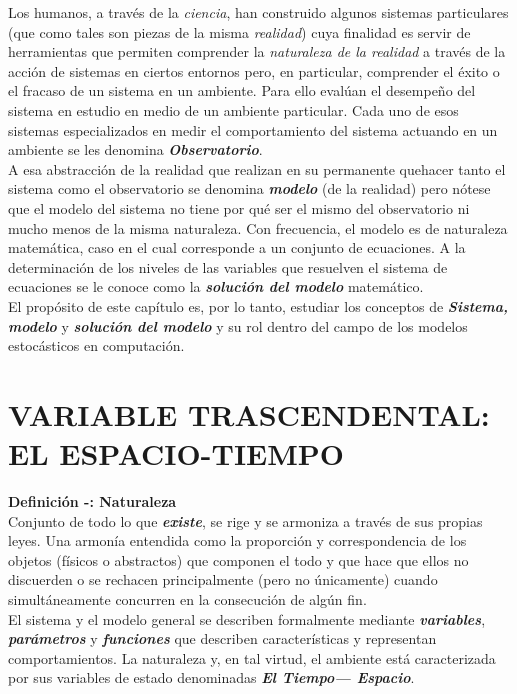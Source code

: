 Los humanos, a través de la \textit{ciencia}, han construido algunos sistemas particulares (que como tales son piezas de la misma \textit{realidad}) cuya finalidad es servir de herramientas que permiten comprender la \textit{naturaleza de la realidad} a través de la acción de sistemas en ciertos entornos pero, en particular, comprender el éxito o el fracaso de un sistema en un ambiente. Para ello evalúan el desempeño del sistema en estudio en medio de un ambiente particular. Cada uno de esos sistemas especializados en medir el comportamiento del sistema actuando en un ambiente se les denomina \textbf{\textit{Observatorio}}.\\

A esa abstracción de la realidad que realizan en su permanente quehacer tanto el sistema como el observatorio se denomina \textbf{\textit{modelo}} (de la realidad) pero nótese que el modelo del sistema no tiene por qué ser el mismo del observatorio ni mucho menos de la misma naturaleza. Con frecuencia, el modelo es de naturaleza matemática, caso en el cual corresponde a un conjunto de ecuaciones. A la determinación de los niveles de las variables que resuelven el sistema de ecuaciones se le conoce como la \textbf{\textit{solución del modelo}} matemático.\\

El propósito de este capítulo es, por lo tanto, estudiar los conceptos de \textbf{\textit{Sistema, modelo}}  y \textbf{\textit{solución del modelo}}  y su rol dentro del campo de los modelos estocásticos en computación.

\section{VARIABLE TRASCENDENTAL: EL ESPACIO-TIEMPO}\label{sec:varTrasc}

\textbf{Definición -: Naturaleza}\\

Conjunto de todo lo que \textit{\textbf{existe}}, se rige y se armoniza a través de sus propias leyes. Una armonía entendida como la proporción y correspondencia de los objetos (físicos o abstractos) que componen el todo y que hace que ellos no discuerden o se rechacen principalmente (pero no únicamente) cuando simultáneamente concurren en la consecución de algún fin.\\

El sistema y el modelo general se describen formalmente mediante \textit{\textbf{variables}}, \textit{\textbf{parámetros}} y \textit{\textbf{funciones}} que describen características y representan comportamientos. La naturaleza y, en tal virtud, el ambiente está caracterizada por sus variables de estado denominadas \textit{\textbf{El Tiempo— Espacio}}.\\ 

